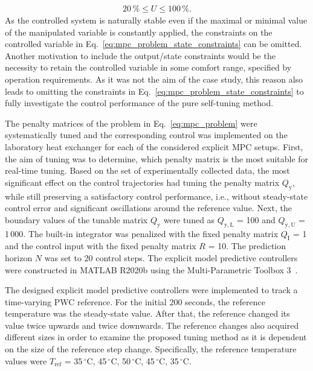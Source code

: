 \documentclass[preprint,12pt]{elsarticle}
\begin{document}
\begin{eqnarray}
	\label{eq:U_const}
	20\,\% \le U \le 100\,\%.
\end{eqnarray}	
As the controlled system is naturally stable even if the maximal or minimal value of the manipulated variable is constantly applied, the constraints on the controlled variable in Eq.~\eqref{eq:mpc_problem_state_constraints} can be omitted. Another motivation to include the output/state constraints would be the necessity to retain the controlled variable in some comfort range, specified by operation requirements. As it was not the aim of the case study, this reason also leads to omitting the constraints in Eq.~\eqref{eq:mpc_problem_state_constraints} to fully investigate the control performance of the pure self-tuning method.		 

The penalty matrices of the problem in Eq.~\eqref{eq:mpc_problem} were systematically tuned and the corresponding control was implemented on the laboratory heat exchanger for each of the considered explicit MPC setups. 
First, the aim of tuning was to determine, which penalty matrix is the most suitable for real-time tuning. Based on the set of experimentally collected data, the most significant effect on the control trajectories had tuning the penalty matrix $Q_\mathrm{y}$, while still preserving a satisfactory control performance, i.e., without steady-state control error and significant oscillations around the reference value. Next, the boundary values of the tunable matrix $Q_\mathrm{y}$ were tuned as $Q_\mathrm{y, L}$ = 100 and $Q_\mathrm{y, U}$ = 1\,000. The built-in integrator was penalized with the fixed penalty matrix $Q_\mathrm{I}$ = 1 and the control input with the fixed penalty matrix $R$ = 10. The prediction horizon $N$ was set to 20 control steps. The explicit model predictive controllers were constructed in MATLAB R2020b using the Multi-Parametric Toolbox 3~\cite{mpt_conf}. 


The designed explicit model predictive controllers were implemented to track a time-varying PWC reference. 
For the initial 200 seconds, the reference temperature was the steady-state value. After that, the reference changed its value twice upwards and twice downwards. The reference changes also acquired different sizes in order to examine the proposed tuning method as it is dependent on the size of the reference step change. Specifically, the reference temperature values were $T_{\mathrm{ref}}$ = 35\,$^{\circ}\mathrm{C}$, 45\,$^{\circ}\mathrm{C}$, 50\,$^{\circ}\mathrm{C}$, 45\,$^{\circ}\mathrm{C}$, 35\,$^{\circ}\mathrm{C}$.
\end{document}
